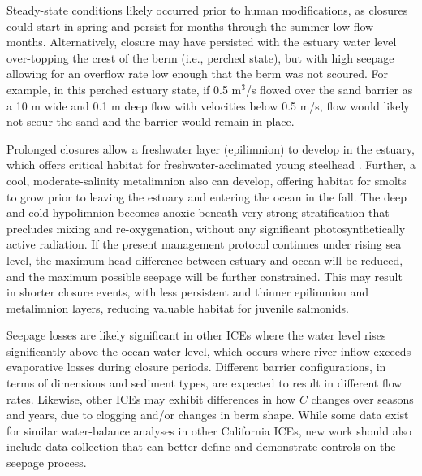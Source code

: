 \documentclass[preprint,12pt,authoryear]{elsarticle}
\begin{document}
Steady-state conditions likely occurred prior to human modifications, as closures could start in spring and persist for months through the summer low-flow months. Alternatively, closure may have persisted with the estuary water level over-topping the crest of the berm (i.e., perched state), but with high seepage allowing for an overflow rate low enough that the berm was not scoured. For example, in this perched estuary state, if 0.5 m$^3$/s flowed over the sand barrier as a 10 m wide and 0.1 m deep flow with velocities below 0.5 m/s, flow would likely  not scour the sand and the barrier would remain in place. 
 
Prolonged closures allow a freshwater layer (epilimnion) to develop in the estuary, which offers critical habitat for freshwater-acclimated young steelhead \citep{largier20205}. Further, a cool, moderate-salinity metalimnion also can develop, offering habitat for smolts to grow prior to leaving the estuary and entering the ocean in the fall. The deep and cold hypolimnion becomes anoxic beneath very strong stratification that precludes mixing and re-oxygenation, without any significant photosynthetically active radiation. If the present management protocol continues under rising sea level, the maximum head difference between estuary and ocean will be reduced, and the maximum possible seepage will be further constrained.  This may result in shorter closure events, with less persistent and thinner epilimnion and metalimnion layers, reducing valuable habitat for juvenile salmonids.  


 Seepage losses are likely significant in other ICEs where the water level rises significantly above the ocean water level, which occurs where river inflow exceeds evaporative losses during closure periods.  Different barrier configurations, in terms of dimensions and sediment types, are expected to result in different flow rates.  Likewise, other ICEs may exhibit differences in how $C$ changes over seasons and years, due to clogging and/or changes in berm shape. While some data exist for similar water-balance analyses in other California ICEs, new work should also include data collection that can better define and demonstrate controls on the seepage process.
\end{document}
